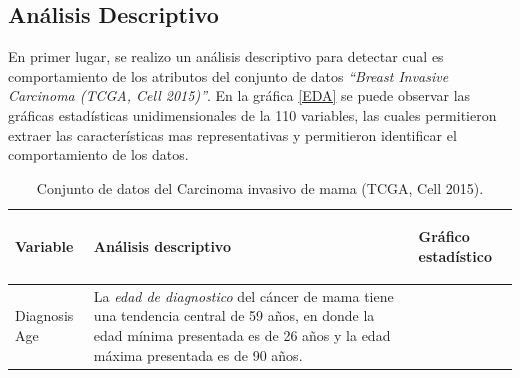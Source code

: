 \clearpage	
\newpage
\subsection{Análisis Descriptivo }
En primer lugar, se realizo un análisis descriptivo para detectar cual es comportamiento de los atributos del conjunto de datos \textit{“Breast Invasive Carcinoma (TCGA, Cell 2015)”}. En la gráfica \ref{EDA} se puede observar las gráficas estadísticas unidimensionales de la 110 variables, las cuales permitieron extraer  las características mas representativas y permitieron identificar el comportamiento de los datos.

\begin{table}[!htb]
	\footnotesize
	\begin{threeparttable}
		\caption{Conjunto de datos del Carcinoma invasivo de mama (TCGA, Cell 2015).}
		\label{Analisis_Descriptivo}
		\begin{tabular}{p{2.5cm} p{7cm} p{6.5cm}} \toprule
			\begin{center}Variable\end{center}   	 
			&\begin{center}Análisis descriptivo\end{center}             
			&\begin{center}Gráfico estadístico\end{center}\\ \hline
			Diagnosis Age
			& La \textit{edad de diagnostico} del cáncer de mama tiene una tendencia central de 59 años, en donde la edad mínima presentada es de  26 años y la edad máxima presentada es de 90 años.
			

\end{tabular}
\end{threeparttable}
\end{table}
